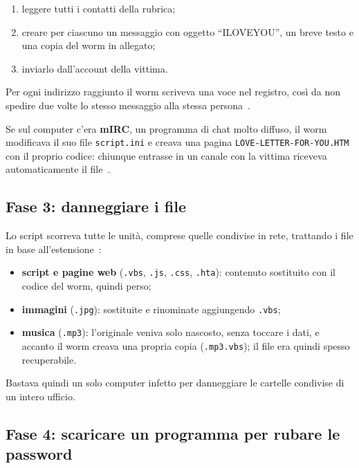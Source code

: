 \begin{enumerate}
    \item leggere tutti i contatti della rubrica;
    \item creare per ciascuno un messaggio con oggetto ``ILOVEYOU'', un breve testo e una copia del worm in allegato;
    \item inviarlo dall'account della vittima.
\end{enumerate}

Per ogni indirizzo raggiunto il worm scriveva una voce nel registro, così da non spedire due volte lo stesso messaggio alla stessa persona~\cite{bishop2000}.

Se sul computer c'era \textbf{mIRC}, un programma di chat molto diffuso, il worm modificava il suo file \texttt{script.ini} e creava una pagina \texttt{LOVE-LETTER-FOR-YOU.HTM} con il proprio codice: chiunque entrasse in un canale con la vittima riceveva automaticamente il file~\cite{cert2000, bishop2000}.

\subsection{Fase 3: danneggiare i file}\label{subsec:fase3}

Lo script scorreva tutte le unità, comprese quelle condivise in rete, trattando i file in base all'estensione~\cite{bishop2000}:

\begin{itemize}
    \item \textbf{script e pagine web} (\texttt{.vbs}, \texttt{.js}, \texttt{.css}, \texttt{.hta}): contenuto sostituito con il codice del worm, quindi perso;
    \item \textbf{immagini} (\texttt{.jpg}): sostituite e rinominate aggiungendo \texttt{.vbs};
    \item \textbf{musica} (\texttt{.mp3}): l'originale veniva solo nascosto, senza toccare i dati, e accanto il worm creava una propria copia (\texttt{.mp3.vbs}); il file era quindi spesso recuperabile.
\end{itemize}

Bastava quindi un solo computer infetto per danneggiare le cartelle condivise di un intero ufficio.

\subsection{Fase 4: scaricare un programma per rubare le password}

